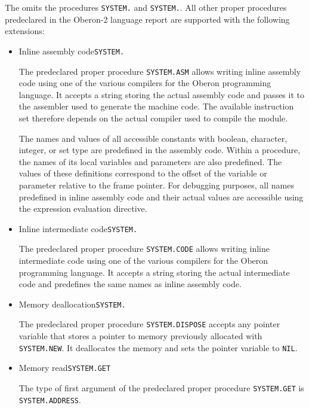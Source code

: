 The \ecs{} omits the procedures \texttt{SYSTEM.} and \texttt{SYSTEM.}.
All other proper procedures predeclared in the Oberon-2 language report are supported with the following extensions:

\begin{itemize}

\item Inline assembly code\alignright\texttt{SYSTEM.}\nopagebreak

The predeclared proper procedure \texttt{SYSTEM.ASM} allows writing inline assembly code using one of the various compilers for the Oberon programming language.
It accepts a string storing the actual assembly code and passes it to the assembler used to generate the machine code.
The available instruction set therefore depends on the actual compiler used to compile the module.
\seeassembly

The names and values of all accessible constants with boolean, character, integer, or set type are predefined in the assembly code.
Within a procedure, the names of its local variables and parameters are also predefined.
The values of these definitions correspond to the offset of the variable or parameter relative to the frame pointer.
For debugging purposes, all names predefined in inline assembly code and their actual values are accessible using the expression evaluation directive.

\item Inline intermediate code\alignright\texttt{SYSTEM.}\nopagebreak

The predeclared proper procedure \texttt{SYSTEM.CODE} allows writing inline intermediate code using one of the various compilers for the Oberon programming language.
It accepts a string storing the actual intermediate code and predefines the same names as inline assembly code.
\seecode

\item Memory deallocation\alignright\texttt{SYSTEM.}\nopagebreak

The predeclared proper procedure \texttt{SYSTEM.DISPOSE} accepts any pointer variable that stores a pointer to memory previously allocated with \texttt{SYSTEM.NEW}.
It deallocates the memory and sets the pointer variable to \texttt{NIL}.

\item Memory read\alignright\texttt{SYSTEM.GET}\nopagebreak

The type of first argument of the predeclared proper procedure \texttt{SYSTEM.GET} is \texttt{SYSTEM.AD\-DRESS}.


\end{itemize}
